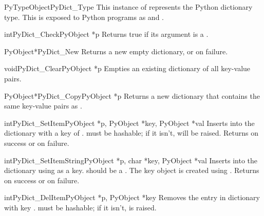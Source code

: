 \documentclass{manual}
\begin{document}
\begin{cvardesc}{PyTypeObject}{PyDict_Type}
This instance of  represents the Python dictionary 
type.  This is exposed to Python programs as  and 
.
\end{cvardesc}

\begin{cfuncdesc}{int}{PyDict_Check}{PyObject *p}
Returns true if its argument is a .
\end{cfuncdesc}

\begin{cfuncdesc}{PyObject*}{PyDict_New}{}
Returns a new empty dictionary, or \NULL{} on failure.
\end{cfuncdesc}

\begin{cfuncdesc}{void}{PyDict_Clear}{PyObject *p}
Empties an existing dictionary of all key-value pairs.
\end{cfuncdesc}

\begin{cfuncdesc}{PyObject*}{PyDict_Copy}{PyObject *p}
Returns a new dictionary that contains the same key-value pairs as
.
\end{cfuncdesc}

\begin{cfuncdesc}{int}{PyDict_SetItem}{PyObject *p, PyObject *key,
                                       PyObject *val}
Inserts  into the dictionary  with a key of .
 must be hashable; if it isn't,  will be 
raised.
Returns  on success or  on failure.
\end{cfuncdesc}

\begin{cfuncdesc}{int}{PyDict_SetItemString}{PyObject *p,
            char *key,
            PyObject *val}
Inserts  into the dictionary  using 
as a key.  should be a .  The key object is
created using .
Returns  on success or  on failure.
\end{cfuncdesc}

\begin{cfuncdesc}{int}{PyDict_DelItem}{PyObject *p, PyObject *key}
Removes the entry in dictionary  with key .
 must be hashable; if it isn't,  is
raised.
\end{cfuncdesc}
\end{document}

